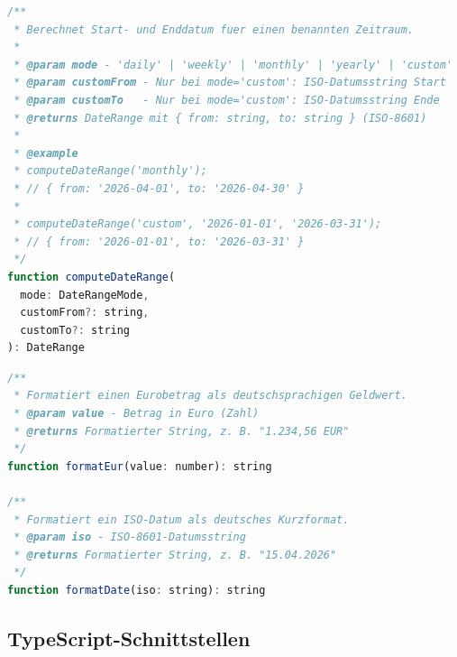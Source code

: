 \documentclass[11pt, a4paper, oneside]{report}
\begin{document}
\begin{lstlisting}[language=JavaScript, caption={JSDoc-Dokumentation: computeDateRange()}]
/**
 * Berechnet Start- und Enddatum fuer einen benannten Zeitraum.
 *
 * @param mode - 'daily' | 'weekly' | 'monthly' | 'yearly' | 'custom'
 * @param customFrom - Nur bei mode='custom': ISO-Datumsstring Start
 * @param customTo   - Nur bei mode='custom': ISO-Datumsstring Ende
 * @returns DateRange mit { from: string, to: string } (ISO-8601)
 *
 * @example
 * computeDateRange('monthly');
 * // { from: '2026-04-01', to: '2026-04-30' }
 *
 * computeDateRange('custom', '2026-01-01', '2026-03-31');
 * // { from: '2026-01-01', to: '2026-03-31' }
 */
function computeDateRange(
  mode: DateRangeMode,
  customFrom?: string,
  customTo?: string
): DateRange
\end{lstlisting}

\begin{lstlisting}[language=JavaScript, caption={JSDoc-Dokumentation: Hilfsfunktionen}]
/**
 * Formatiert einen Eurobetrag als deutschsprachigen Geldwert.
 * @param value - Betrag in Euro (Zahl)
 * @returns Formatierter String, z. B. "1.234,56 EUR"
 */
function formatEur(value: number): string

/**
 * Formatiert ein ISO-Datum als deutsches Kurzformat.
 * @param iso - ISO-8601-Datumsstring
 * @returns Formatierter String, z. B. "15.04.2026"
 */
function formatDate(iso: string): string
\end{lstlisting}

\subsection*{TypeScript-Schnittstellen}
\end{document}
